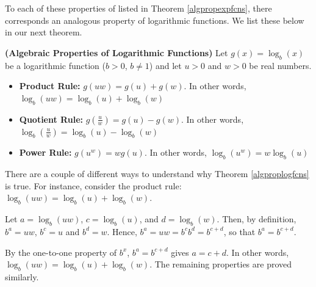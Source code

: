 \documentclass{ximera}
\begin{document}


To each of these properties of listed in Theorem \ref{algpropexpfcns}, there corresponds an analogous property of logarithmic functions.  We list these below in our next theorem.


\begin{theorem}  \label{algproplogfcns} \textbf{(Algebraic Properties of Logarithmic Functions)}  Let $g(x) =\log_{b}(x)$ be a logarithmic function ($b > 0$, $b\neq 1$) and let $u>0$ and $w>0$ be real numbers. 

\begin{itemize}

\item  \textbf{Product Rule:}  $g(uw) = g(u)+ g(w)$.  In other words, $\log_{b}(uw) = \log_{b}(u) + \log_{b}(w)$

\item  \textbf{Quotient Rule:}  $g\left(\frac{u}{w} \right) = g(u) - g(w)$.  In other words, $\log_{b} \left( \frac{u}{w} \right) = \log_{b}(u) - \log_{b}(w)$

\item  \textbf{Power Rule:}  $g\left(u^{w}\right) =w g(u)$.  In other words, $\log_{b}\left(u^{w}\right) = w \log_{b}(u)$

\end{itemize}

\end{theorem}




There are a couple of different ways to understand why Theorem \ref{algproplogfcns} is true.  For instance, consider  the product rule: $\log_{b}(uw) = \log_{b}(u) + \log_{b}(w)$.  



Let $a = \log_{b}(uw)$, $c = \log_{b}(u)$, and $d = \log_{b}(w)$.  Then, by definition, $b^{a} = uw$, $b^{c} = u$ and $b^{d} = w$.  Hence, $b^{a} = uw = b^{c} b^{d} = b^{c+d}$, so that $b^{a} = b^{c+d}$. 



By the one-to-one property of $b^{x}$,  $b^{a} = b^{c+d}$ gives $a = c+d$. In other words, $\log_{b}(uw) = \log_{b}(u) + \log_{b}(w)$.  The remaining properties are proved similarly.  
\end{document}
